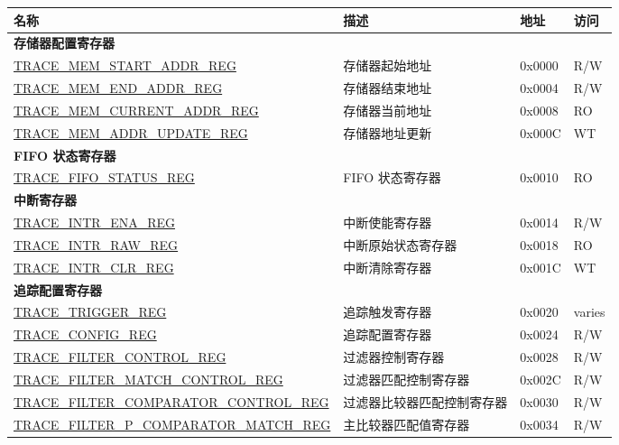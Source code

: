 \begin{longtable}{ | p{8cm} | p{6.2cm} | p{1.3cm} | p{1cm} | }
\hline\rowcolor{lightgray}
\textbf{名称} & \textbf{描述} &  \textbf{地址} & \textbf{访问} \\ \hline
\endhead
\multicolumn{4}{|l|}{\textbf{存储器配置寄存器}} \\ \hline
\hyperref[regdesc:TRACEMEMSTARTADDRREG]{TRACE\_MEM\_START\_ADDR\_REG} & 存储器起始地址 & 0x0000 & R/W \\ \hline
\hyperref[regdesc:TRACEMEMENDADDRREG]{TRACE\_MEM\_END\_ADDR\_REG} & 存储器结束地址 & 0x0004 & R/W \\ \hline
\hyperref[regdesc:TRACEMEMCURRENTADDRREG]{TRACE\_MEM\_CURRENT\_ADDR\_REG} & 存储器当前地址 & 0x0008 & RO \\ \hline
\hyperref[regdesc:TRACEMEMADDRUPDATEREG]{TRACE\_MEM\_ADDR\_UPDATE\_REG} & 存储器地址更新 & 0x000C & WT \\ \hline
\multicolumn{4}{|l|}{\textbf{FIFO 状态寄存器}} \\ \hline
\hyperref[regdesc:TRACEFIFOSTATUSREG]{TRACE\_FIFO\_STATUS\_REG} & FIFO 状态寄存器 & 0x0010 & RO \\ \hline
\multicolumn{4}{|l|}{\textbf{中断寄存器}} \\ \hline
\hyperref[regdesc:TRACEINTRENAREG]{TRACE\_INTR\_ENA\_REG} & 中断使能寄存器 & 0x0014 & R/W \\ \hline
\hyperref[regdesc:TRACEINTRRAWREG]{TRACE\_INTR\_RAW\_REG} & 中断原始状态寄存器 & 0x0018 & RO \\ \hline
\hyperref[regdesc:TRACEINTRCLRREG]{TRACE\_INTR\_CLR\_REG} & 中断清除寄存器 & 0x001C & WT \\ \hline
\multicolumn{4}{|l|}{\textbf{追踪配置寄存器}} \\ \hline
\hyperref[regdesc:TRACETRIGGERREG]{TRACE\_TRIGGER\_REG} & 追踪触发寄存器 & 0x0020 & varies \\ \hline
\hyperref[regdesc:TRACECONFIGREG]{TRACE\_CONFIG\_REG} & 追踪配置寄存器 & 0x0024 & R/W \\ \hline
\hyperref[regdesc:TRACEFILTERCONTROLREG]{TRACE\_FILTER\_CONTROL\_REG} & 过滤器控制寄存器 & 0x0028 & R/W \\ \hline
\hyperref[regdesc:TRACEFILTERMATCHCONTROLREG]{TRACE\_FILTER\_MATCH\_CONTROL\_REG} & 过滤器匹配控制寄存器 & 0x002C & R/W \\ \hline
\hyperref[regdesc:TRACEFILTERCOMPARATORCONTROLREG]{TRACE\_FILTER\_COMPARATOR\_CONTROL\_REG} & 过滤器比较器匹配控制寄存器 & 0x0030 & R/W \\ \hline
\hyperref[regdesc:TRACEFILTERPCOMPARATORMATCHREG]{TRACE\_FILTER\_P\_COMPARATOR\_MATCH\_REG} & 主比较器匹配值寄存器 & 0x0034 & R/W \\ \hline

\end{longtable}
